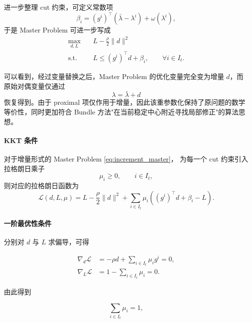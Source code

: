 \documentclass[11pt]{ctexart}
\begin{document}
进一步整理 cut 约束，可定义常数项
\begin{equation}
\beta_i
=
(g^i)^\top
(\bar{\lambda}-\lambda^i)
+
\omega(\lambda^i),
\end{equation}
于是 Master Problem 可进一步写成
\begin{equation}
\label{eq:increment_master}
\begin{aligned}
\max_{d,L}
\quad
&
L
-
\frac{\rho}{2}\|d\|^2
\\
\text{s.t.}\quad
&
L
\le
(g^i)^\top d+\beta_i,
\qquad
\forall i\in I_t.
\end{aligned}
\end{equation}

可以看到，经过变量替换之后，Master Problem 的优化变量完全变为增量
$d$，而原始对偶变量仅通过
\begin{equation}
\lambda=\bar{\lambda}+d
\end{equation}
恢复得到。由于 proximal 项仅作用于增量，因此该重参数化保持了原问题的数学等价性，同时更加符合 Bundle 方法"在当前稳定中心附近寻找局部修正"的算法思想。

\paragraph{KKT 条件}

对于增量形式的 Master Problem \eqref{eq:increment_master}，
为每一个 cut 约束引入拉格朗日乘子
\[
\mu_i \ge 0,
\qquad
i\in I_t,
\]
则对应的拉格朗日函数为
\begin{equation}
\mathcal L(d,L,\mu)
=
L
-
\frac{\rho}{2}\|d\|^2
+
\sum_{i\in I_t}
\mu_i
\left(
(g^i)^\top d
+\beta_i
-
L
\right).
\end{equation}

\paragraph{一阶最优性条件}

分别对 $d$ 与 $L$ 求偏导，可得

\begin{align}
\nabla_d \mathcal L
&=
-\rho d
+
\sum_{i\in I_t}
\mu_i g^i
=0,
\label{eq:kkt_d}
\\
\nabla_L \mathcal L
&=
1-
\sum_{i\in I_t}
\mu_i
=0.
\label{eq:kkt_L}
\end{align}

由此得到

\begin{equation}
\sum_{i\in I_t}\mu_i=1,
\end{equation}
\end{document}
